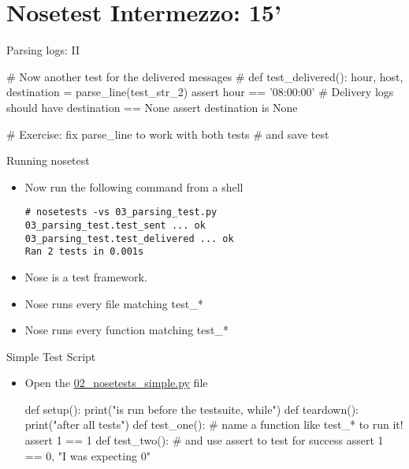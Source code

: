 \section{Nosetest Intermezzo: 15'}


\begin{pyframe}{Parsing logs: II}
\begin{pycode}
# Now another test for the delivered messages
#  %
def test_delivered():
    hour, host, destination = parse_line(test_str_2)
    assert hour == '08:00:00'
    # Delivery logs should have destination == None
    assert destination is None

# Exercise: fix parse_line to work with both tests
#  and save test
\end{pycode}
\end{pyframe}


\begin{pyframe}{Running nosetest}
\begin{itemize}
\item Now run the following command from a shell

\begin{verbatim}
# nosetests -vs 03_parsing_test.py  
03_parsing_test.test_sent ... ok        
03_parsing_test.test_delivered ... ok 
Ran 2 tests in 0.001s                 
\end{verbatim}
\item Nose is a test framework.
\item Nose runs every file matching test\_*
\item Nose runs every function matching test\_*
\end{itemize}
\end{pyframe}

\begin{pyframe}{Simple Test Script}
\begin{itemize}
\item Open the \href{https://github.com/ioggstream/python-course/blob/master/python-for-sysadmin/02\_nosetests\_simple.py}{02\_nosetests\_simple.py} file
\begin{pycode}
def setup():
    print("is run before the testsuite, while")
def teardown():
    print("after all tests")
def test_one():
    # name a function like test_* to run it!
    assert 1 == 1 
def test_two():
    # and use assert to test for success
    assert 1 == 0, "I was expecting 0" 
\end{pycode}
\end{itemize}
\end{pyframe}

